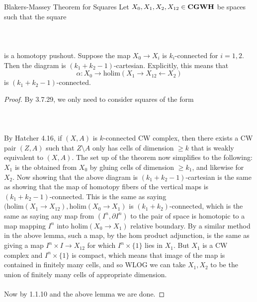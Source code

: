 \documentclass[a4paper]{article}
\begin{document}
\begin{thm}{Blakers-Massey Theorem for Squares}{} Let $X_0,X_1,X_2,X_{12}\in\bold{CGWH}$ be spaces such that the square \\~\\
\\~\\
is a homotopy pushout. Suppose the map $X_0\to X_i$ is $k_i$-connected for $i=1,2$. Then the diagram is $(k_1+k_2-1)$-cartesian. Explicitly, this means that $$\alpha:X_0\to\text{holim}(X_1\rightarrow X_{12}\leftarrow X_2)$$ is $(k_1+k_2-1)$-connected. \tcbline
\begin{proof}
By 3.7.29, we only need to consider squares of the form \\~\\
\\~\\
By Hatcher 4.16, if $(X,A)$ is $k$-connected CW complex, then there exists a CW pair $(Z,A)$ such that $Z\setminus A$ only has cells of dimension $\geq k$ that is weakly equivalent to $(X,A)$. The set up of the theorem now simplifies to the following: $X_1$ is the obtained from $X_0$ by gluing cells of dimension $\geq k_1$, and likewise for $X_2$. Now showing that the above diagram is $(k_1+k_2-1)$-cartesian is the same as showing that the map of homotopy fibers of the vertical maps is $(k_1+k_2-1)$-connected. This is the same as saying $(\text{holim}(X_1\to X_{12}),\text{holim}(X_0\to X_1)$ is $(k_1+k_2)$-connected, which is the same as saying any map from $(I^n,\partial I^n)$ to the pair of space is homotopic to a map mapping $I^n$ into $\text{holim}(X_0\to X_1)$ relative boundary. By a similar method in the above lemma, such a map, by the hom product adjunction, is the same as giving a map $I^n\times I\to X_{12}$ for which $I^n\times\{1\}$ lies in $X_1$. But $X_1$ is a CW complex and $I^n\times\{1\}$ is compact, which means that image of the map is contained in finitely many cells, and so WLOG we can take $X_1,X_2$ to be the union of finitely many cells of appropriate dimension. \\~\\

Now by 1.1.10 and the above lemma we are done. 
\end{proof}
\end{thm}
\end{document}
